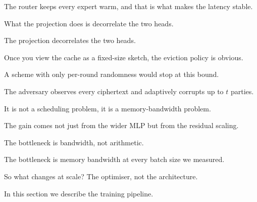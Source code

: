 
The router keeps every expert warm, and that is what makes the latency stable.

What the projection does is decorrelate the two heads.

The projection decorrelates the two heads.

Once you view the cache as a fixed-size sketch, the eviction policy is obvious.

A scheme with only per-round randomness would stop at this bound.

The adversary observes every ciphertext and adaptively corrupts up to $t$ parties.

It is not a scheduling problem, it is a memory-bandwidth problem.

The gain comes not just from the wider MLP but from the residual scaling.

The bottleneck is bandwidth, not arithmetic.

The bottleneck is memory bandwidth at every batch size we measured.

So what changes at scale? The optimiser, not the architecture.

In this section we describe the training pipeline.

